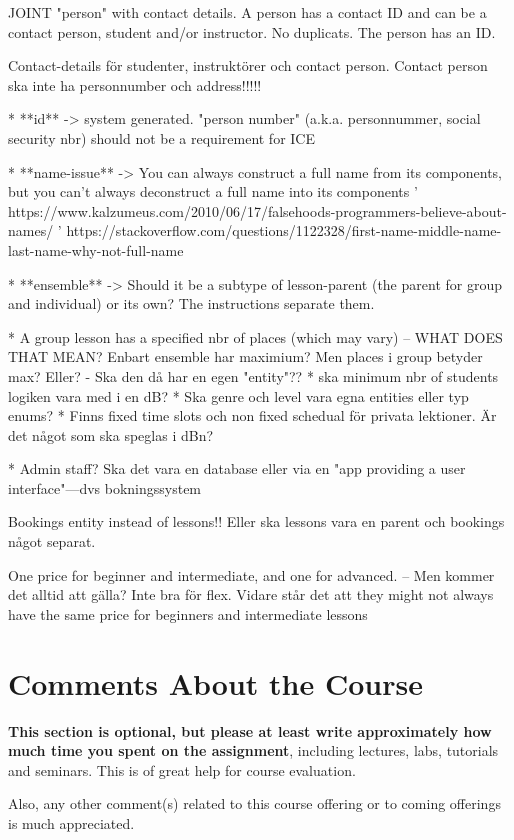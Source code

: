 \documentclass[a4paper]{scrartcl}
\begin{document}
JOINT "person" with contact details. A person has a contact ID and can be a contact person, student and/or instructor. No duplicats. The person has an ID.

Contact-details för studenter, instruktörer och contact person. Contact person ska inte ha personnumber och address!!!!!

* **id** -> system generated. "person number" (a.k.a. personnummer, social security nbr) should not be a requirement for ICE

* **name-issue** -> You can always construct a full name from its components, but you can't always deconstruct a full name into its components
' https://www.kalzumeus.com/2010/06/17/falsehoods-programmers-believe-about-names/
' https://stackoverflow.com/questions/1122328/first-name-middle-name-last-name-why-not-full-name 

* **ensemble** -> Should it be a subtype of lesson-parent (the parent for group and individual) or its own?  The instructions separate them.

* A group lesson has a specified nbr of places (which may vary) -- WHAT DOES THAT MEAN?
Enbart ensemble har maximium? Men places i group betyder max? Eller?
  - Ska den då har en egen "entity"??
* ska minimum nbr of students logiken vara med i en dB?
* Ska genre och level vara egna entities eller typ enums?
* Finns fixed time slots och non fixed schedual för privata lektioner. Är det något som ska speglas i dBn?

* Admin staff? Ska det vara en database eller via en "app providing a user interface"---dvs bokningssystem

Bookings entity instead of lessons!! Eller ska lessons vara en parent och bookings något separat.

One price for beginner and intermediate, and one for advanced. -- Men kommer det alltid att gälla? Inte bra för flex. Vidare står det att they might not always
have the same price for beginners and intermediate lessons


\section{Comments About the Course}

\textbf{This section is optional, but please at least write approximately how much time you spent on the assignment}, including lectures, labs, tutorials and seminars. This is of great help for course evaluation.

Also, any other comment(s) related to this course offering or to coming offerings is much appreciated. 
\end{document}
